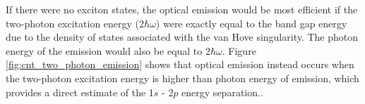 If there were no exciton states, the optical emission would be most efficient if the two-photon excitation energy (2$\hbar \omega$) were exactly equal to the band gap energy due to the density of states associated with the van Hove singularity. The photon energy of the emission would also be equal to 2$\hbar \omega$. Figure \ref{fig:cnt_two_photon_emission} shows that optical emission instead occurs when the two-photon excitation energy is higher than photon energy of emission, which provides a direct estimate of the 1$s$ - 2$p$ energy separation..







